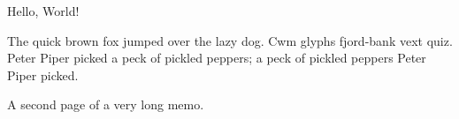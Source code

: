 \documentclass{gsmemo}
\begin{document}
\subject{MPhil to PhD transfer}

\maketitle

Hello, World!

The quick brown fox jumped over the lazy dog.  Cwm glyphs fjord-bank
vext quiz.  Peter Piper picked a peck of pickled peppers; a peck of
pickled peppers Peter Piper picked.

\clearpage

A second page of a very long memo.
\end{document}
